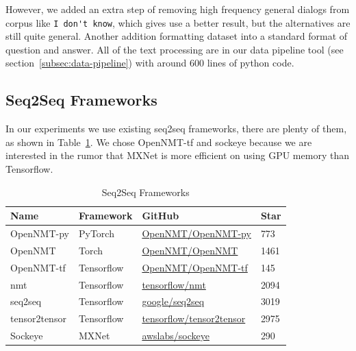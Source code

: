 \documentclass{article}
\begin{document}
However, we added an extra step of removing high frequency general dialogs from corpus like \verb+I don't know+,
which gives use a better result, but the alternatives are still quite general.
Another addition formatting dataset into a standard format of question and answer.
All of the text processing are in our data pipeline tool (see section~\ref{subsec:data-pipeline}) with around 600 lines of python code.


\subsection{Seq2Seq Frameworks}
\label{subsec:seq2seq-frameworks}

In our experiments we use existing seq2seq frameworks, there are plenty of them, as shown in Table~\ref{table:seq2seq-frameworks}.
We chose OpenNMT-tf and sockeye because we are interested in the rumor that MXNet is more efficient on using GPU memory than Tensorflow.

\begin{table}[h]
    \caption{Seq2Seq Frameworks}
    \label{table:seq2seq-frameworks}
    \centering
    \begin{tabular}{llll}
        \toprule
        Name & Framework & GitHub & Star \\
        \midrule
        OpenNMT-py & PyTorch & \href{https://github.com/OpenNMT/OpenNMT-py}{OpenNMT/OpenNMT-py} & 773 \\
        OpenNMT & Torch & \href{https://github.com/OpenNMT/OpenNMT}{OpenNMT/OpenNMT} & 1461 \\
        OpenNMT-tf & Tensorflow & \href{https://github.com/OpenNMT/OpenNMT-tf}{OpenNMT/OpenNMT-tf} & 145 \\
        nmt & Tensorflow & \href{https://github.com/tensorflow/nmt}{tensorflow/nmt} & 2094 \\
        seq2seq & Tensorflow & \href{https://github.com/google/seq2seq}{google/seq2seq} & 3019 \\
        tensor2tensor & Tensorflow & \href{https://github.com/tensorflow/tensor2tensor}{tensorflow/tensor2tensor} & 2975 \\
        Sockeye & MXNet & \href{https://github.com/awslabs/sockeye}{awslabs/sockeye} & 290 \\
        \bottomrule
    \end{tabular}
\end{table}
\end{document}
